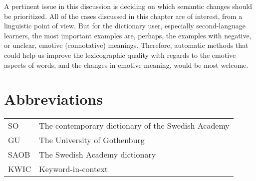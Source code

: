 \documentclass[output=paper]{langscibook}
\begin{document}
A pertinent issue in this discussion is deciding on which semantic changes should be prioritized. All of the cases discussed in this chapter are of interest, from a linguistic point of view. But for the dictionary user, especially second-language learners, the most important examples are, perhaps, the examples with negative, or unclear, emotive (connotative) meanings. Therefore, automatic methods that could help us improve the lexicographic quality with regards to the emotive aspects of words, and the changes in emotive meaning, would be most welcome. 

\section*{Abbreviations}
\begin{tabularx}{\textwidth}{@{}lQ@{}}
SO & The contemporary dictionary of the Swedish Academy\\
GU & The University of Gothenburg\\
SAOB & The Swedish Academy dictionary\\
KWIC & Keyword-in-context\\ 
\end{tabularx}

{\sloppy\printbibliography[heading=subbibliography,notkeyword=this]}
\end{document}
